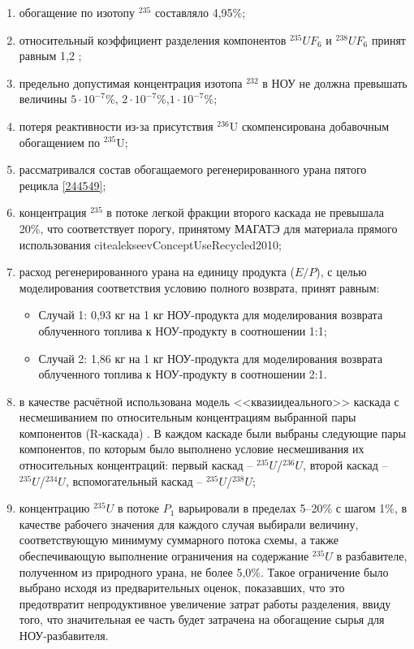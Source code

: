 \begin{enumerate}
    \item обогащение по изотопу $^{235}$ составляло 4,95\%;
    \item относительный коэффициент разделения компонентов $^{235}UF_6$ и $^{238}UF_6$ принят равным 1,2 \cite{smirnovEvolutionIsotopicComposition2012};
    \item предельно допустимая концентрация изотопа $^{232}$ в НОУ не должна превышать величины $5\cdot10^{-7}$\%, $2\cdot10^{-7}$\%,$1\cdot10^{-7}$\%;
    \item потеря реактивности из-за присутствия $^{236}$U скомпенсирована добавочным обогащением по $^{235}$U;
    \item рассматривался состав обогащаемого регенерированного урана пятого рецикла \ref{244549};
    \item концентрация $^{235}$  в потоке легкой фракции второго каскада не превышала 20\%, что соответствует порогу, принятому МАГАТЭ для материала прямого использования cite{alekseevConceptUseRecycled2010};
    \item расход регенерированного урана на единицу продукта ($E / P$), с целью моделирования соответствия условию полного возврата, принят равным:
    \begin{itemize}
        \item Случай 1: 0,93 кг на 1 кг НОУ-продукта для моделирования возврата облученного топлива к НОУ-продукту в соотношении 1:1;
        \item Случай 2: 1,86 кг на 1 кг НОУ-продукта для моделирования возврата облученного топлива к НОУ-продукту в соотношении 2:1.
    \end{itemize}
    \item в качестве расчётной использована модель <<квазиидеального>> каскада \cite{sazykinKvaziidealnyeKaskadyDlya2000} с несмешиванием по относительным концентрациям выбранной пары компонентов (R-каскада) \cite{sulaberidzeTeoriyaKaskadovDlya2011}. В каждом каскаде были выбраны следующие пары компонентов, по которым было выполнено условие несмешивания их относительных концентраций: первый каскад -- $^{235}U$/$^{236}U$, второй каскад -- $^{235}U$/$^{234}U$, вспомогательный каскад -- $^{235}U$/$^{238}U$;
    \item концентрацию $^{235}U$ в потоке $P_1$ варьировали в пределах 5--20\% с шагом 1\%, в качестве рабочего значения для каждого случая выбирали величину, соответствующую минимуму суммарного потока схемы, а также обеспечивающую выполнение ограничения на содержание $^{235}U$ в разбавителе, полученном из природного урана, не более 5,0\%. Такое ограничение было выбрано исходя из предварительных оценок, показавших, что это предотвратит непродуктивное увеличение затрат работы разделения, ввиду того, что значительная ее часть будет затрачена на обогащение сырья для НОУ-разбавителя.
\end{enumerate}


